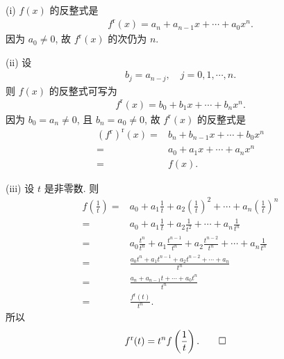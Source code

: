 \begin{pf}
    (i) $f(x)$ 的反整式是
    \begin{align*}
        f^{\mathrm{r}} (x) = a_n + a_{n-1} x + \cdots + a_0 x^n.
    \end{align*}
    因为 $a_0 \neq 0$, 故 $f^{\mathrm{r}} (x)$ 的次仍为 $n$.

    (ii) 设
    \begin{align*}
        b_j = a_{n - j}, \quad j = 0,1,\cdots,n.
    \end{align*}
    则 $f(x)$ 的反整式可写为
    \begin{align*}
        f^{\mathrm{r}} (x) = b_0 + b_1 x + \cdots + b_n x^n.
    \end{align*}
    因为 $b_0 = a_n \neq 0$, 且 $b_n = a_0 \neq 0$, 故 $f^{\mathrm{r}}(x)$ 的反整式是
    \begin{align*}
        (f^{\mathrm{r}})^{\mathrm{r}} (x)
        = {} & b_n + b_{n-1} x + \cdots + b_0 x^n \\
        = {} & a_0 + a_1 x + \cdots + a_n x^n     \\
        = {} & f(x).
    \end{align*}

    (iii) 设 $t$ 是非零数. 则
    \begin{align*}
        f \left( \frac{1}{t} \right)
        = {} & a_0 + a_1 \frac{1}{t} + a_2 \left( \frac{1}{t} \right)^2 + \cdots + a_n \left( \frac{1}{t} \right)^n \\
        = {} & a_0 + a_1 \frac{1}{t} + a_2 \frac{1}{t^2} + \cdots + a_n \frac{1}{t^n}                               \\
        = {} & a_0 \frac{t^n}{t^n} + a_1 \frac{t^{n-1}}{t^n} + a_2 \frac{t^{n-2}}{t^n} + \cdots + a_n \frac{1}{t^n} \\
        = {} & \frac{a_0 t^n + a_1 t^{n-1} + a_2 t^{n-2} + \cdots + a_n}{t^n}                                       \\
        = {} & \frac{a_n + a_{n-1} t + \cdots + a_0 t^n}{t^n}                                                       \\
        = {} & \frac{f^{\mathrm{r}} (t)}{t^n}.
    \end{align*}
    所以
    \begin{align*}
         & f^{\mathrm{r}} (t) = t^n f \left( \frac{1}{t} \right). \qedhere
    \end{align*}
\end{pf}

